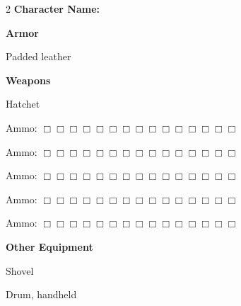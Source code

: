 \documentclass[10pt]{article}
\begin{document}
\begin{multicols}{2}
\textbf{Character Name:} \hrulefill

\vspace{24pt}

\textbf{Armor}


Padded leather




\hrulefill


\hrulefill


\hrulefill



\vspace{24pt}

\textbf{Weapons}


Hatchet




\hrulefill

Ammo: $\Box \Box \Box \Box \Box \Box \Box \Box \Box \Box \Box \Box \Box \Box \Box$ 


\hrulefill

Ammo: $\Box \Box \Box \Box \Box \Box \Box \Box \Box \Box \Box \Box \Box \Box \Box$ 


\hrulefill

Ammo: $\Box \Box \Box \Box \Box \Box \Box \Box \Box \Box \Box \Box \Box \Box \Box$ 


\hrulefill

Ammo: $\Box \Box \Box \Box \Box \Box \Box \Box \Box \Box \Box \Box \Box \Box \Box$ 


\hrulefill

Ammo: $\Box \Box \Box \Box \Box \Box \Box \Box \Box \Box \Box \Box \Box \Box \Box$ 



\vspace{24pt}

\textbf{Other Equipment}


Shovel


Drum, handheld




\hrulefill


\hrulefill


\hrulefill


\hrulefill


\hrulefill


\hrulefill


\hrulefill


\hrulefill


\hrulefill


\hrulefill



\end{multicols}
\end{document}
